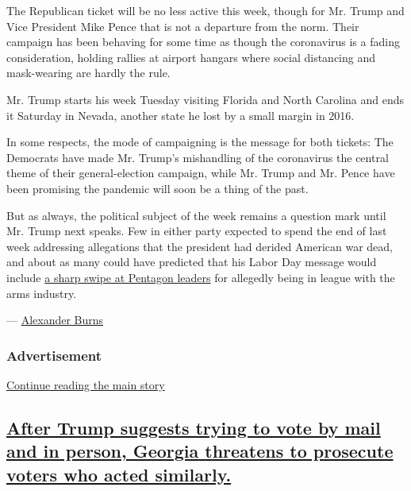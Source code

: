 The Republican ticket will be no less active this week, though for Mr.
Trump and Vice President Mike Pence that is not a departure from the
norm. Their campaign has been behaving for some time as though the
coronavirus is a fading consideration, holding rallies at airport
hangars where social distancing and mask-wearing are hardly the rule.

Mr. Trump starts his week Tuesday visiting Florida and North Carolina
and ends it Saturday in Nevada, another state he lost by a small margin
in 2016.

In some respects, the mode of campaigning is the message for both
tickets: The Democrats have made Mr. Trump's mishandling of the
coronavirus the central theme of their general-election campaign, while
Mr. Trump and Mr. Pence have been promising the pandemic will soon be a
thing of the past.

But as always, the political subject of the week remains a question mark
until Mr. Trump next speaks. Few in either party expected to spend the
end of last week addressing allegations that the president had derided
American war dead, and about as many could have predicted that his Labor
Day message would include
\href{https://www.nytimes3xbfgragh.onion/2020/09/07/us/politics/wisconsin-biden-harris-trump-pence.html}{a
sharp swipe at Pentagon leaders} for allegedly being in league with the
arms industry.

---
\href{https://www.nytimes3xbfgragh.onion/by/alexander-burns}{Alexander
Burns}

\hypertarget{advertisement-2}{%
\subsubsection{Advertisement}\label{advertisement-2}}

\protect\hyperlink{after-dfp-ad-mid3}{Continue reading the main story}

\hypertarget{after-trump-suggests-trying-to-vote-by-mail-and-in-person-georgia-threatens-to-prosecute-voters-who-acted-similarly}{%
\subsection{\texorpdfstring{\protect\hyperlink{after-trump-suggests-trying-to-vote-by-mail-and-in-person-georgia-threatens-to-prosecute-voters-who-acted-similarly}{After
Trump suggests trying to vote by mail and in person, Georgia threatens
to prosecute voters who acted
similarly.}}{After Trump suggests trying to vote by mail and in person, Georgia threatens to prosecute voters who acted similarly.}}\label{after-trump-suggests-trying-to-vote-by-mail-and-in-person-georgia-threatens-to-prosecute-voters-who-acted-similarly}}

